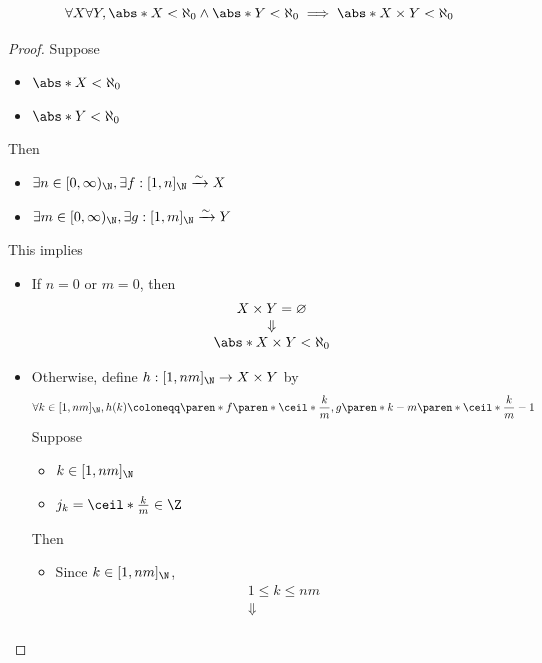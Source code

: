 \begin{lemma} \label{an1:lem:product-of-two-finite-sets-is-finite}
  \[
    \forall X \forall Y, \abs*{X} < \aleph_{0} \land \abs*{Y} < \aleph_{0}
    \implies \abs*{X \times Y} < \aleph_{0}
  \]
\end{lemma}

\begin{proof}
  Suppose
  \begin{itemize}
    \item $\abs*{X} < \aleph_{0}$
    \item $\abs*{Y} < \aleph_{0}$
  \end{itemize}
  Then
  \begin{itemize}
    \item $\exists n \in [0, \infty)_{\N}, \exists f: [1, n]_{\N} \xrightarrow{\sim} X$
    \item $\exists m \in [0, \infty)_{\N}, \exists g: [1, m]_{\N} \xrightarrow{\sim} Y$
  \end{itemize}
  This implies
  \begin{itemize}
    \item If $n = 0$ or $m = 0$, then
          \[
            \begin{array}{c}
              X \times Y = \varnothing \\
              \Downarrow               \\
              \abs*{X \times Y} < \aleph_{0}
            \end{array}
          \]
    \item Otherwise, define $h: [1, nm]_{\N} \to X \times Y$ by
          \[
            \forall k \in [1, nm]_{\N}, h(k) \coloneqq \paren*{f\paren*{\ceil*{\frac{k}{m}}},
              g\paren*{k - m\paren*{\ceil*{\frac{k}{m}} - 1}}}
          \]
          Suppose
          \begin{itemize}
            \item $k \in [1, nm]_{\N}$
            \item $j_{k} = \ceil*{\frac{k}{m}} \in \Z$
          \end{itemize}
          Then
          \begin{itemize}
            \item Since $k \in [1, nm]_{\N}$,
                  \[
                    \begin{array}{c}
                      1 \leq k \leq nm                  \\
                      \Downarrow                        \\

\end{array}\]
\end{itemize}
\end{itemize}
\end{proof}
